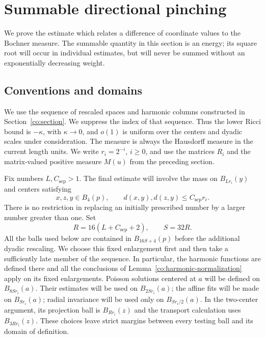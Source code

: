 \section{Summable directional pinching}
\label{pi:section}

We prove the estimate which relates a difference of coordinate values to
the Bochner measure.  The summable quantity in this section is an energy;
its square root will occur in individual estimates, but will never be
summed without an exponentially decreasing weight.

\subsection{Conventions and domains}

We use the sequence of rescaled spaces and harmonic columns constructed
in Section~\ref{co:section}.  We suppress the index of that sequence.
Thus the lower Ricci bound is $-\kappa$, with $\kappa\to0$, and $o(1)$
is uniform over the centers and dyadic scales under consideration.
The measure is always the Hausdorff measure in the current length units.
We write $r_i=2^{-i}$, $i\ge0$, and use the matrices $R_i$ and the
matrix-valued positive measure $M(u)$ from the preceding section.

Fix numbers $L,C_{\mathrm{sep}}>1$.  The final estimate will involve the mass on
$B_{Lr_i}(y)$ and centers satisfying
\begin{equation}
 x,z,y\in B_4(p),\qquad
 d(x,y),d(z,y)\le C_{\mathrm{sep}}r_i.
 \label{pi:center-configuration}
\end{equation}
There is no restriction in replacing an initially prescribed number by
a larger number greater than one.  Set
\begin{equation}
 R=16(L+C_{\mathrm{sep}}+2),\qquad S=32R.
 \label{pi:radii}
\end{equation}
All the balls used below are contained in $B_{16S+4}(p)$ before the
additional dyadic rescaling.  We choose this fixed enlargement first
and then take a sufficiently late member of the sequence.  In
particular, the harmonic functions are defined there and all the
conclusions of Lemma~\ref{co:harmonic-normalization} apply on its
fixed enlargements.  Poisson solutions centered at $a$ will be defined
on $B_{8Sr_i}(a)$.  Their estimates will be used on $B_{2Sr_i}(a)$;
the affine fits will be made on $B_{Sr_i}(a)$; radial invariance will
be used only on $B_{Sr_i/2}(a)$.  In the two-center argument, its
projection ball is $B_{Rr_i}(z)$ and the transport calculation uses
$B_{3Rr_i}(z)$.  These choices leave strict margins between every
testing ball and its domain of definition.

